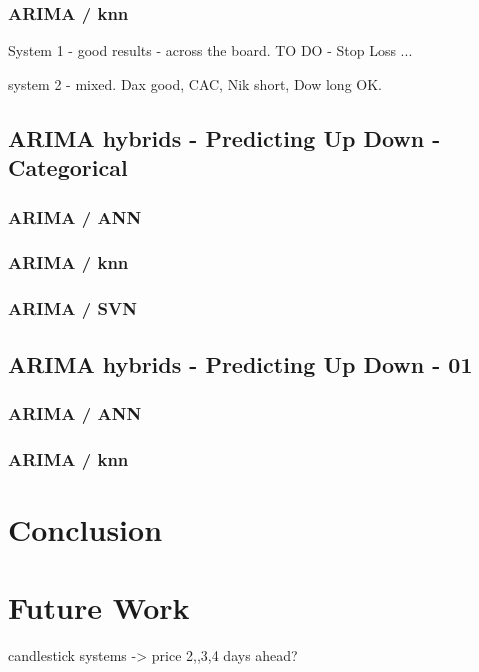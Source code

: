 \subsubsection{ARIMA / knn}

System 1 - good results - across the board.  TO DO - Stop Loss ...

system 2 - mixed.  Dax good, CAC, Nik short, Dow long OK.

\subsection{ARIMA hybrids - Predicting Up Down - Categorical}

\subsubsection{ARIMA / ANN}

\subsubsection{ARIMA / knn}

\subsubsection{ARIMA / SVN}

\subsection{ARIMA hybrids - Predicting Up Down - 01}

\subsubsection{ARIMA / ANN}

\subsubsection{ARIMA / knn}





\section{Conclusion}


\section{Future Work}

candlestick systems -> price 2,,3,4 days ahead?
